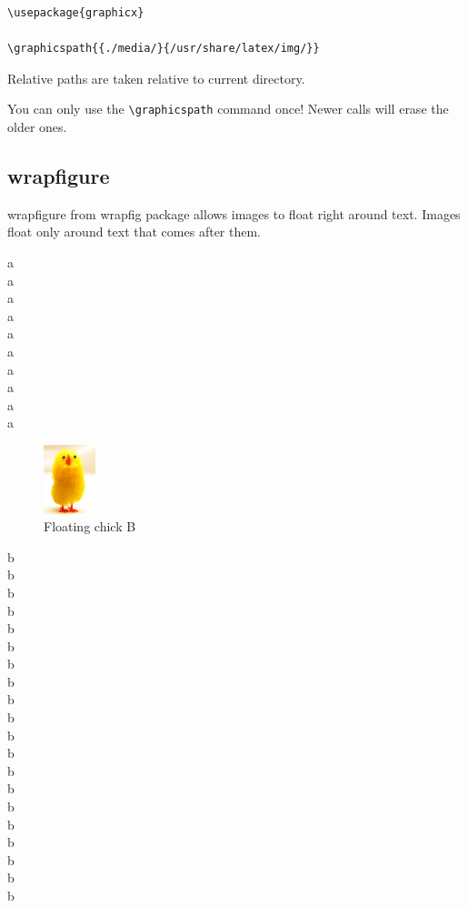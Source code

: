 \documentclass[12pt]{article}
\begin{document}
\begin{lstlisting}
\usepackage{graphicx}

\graphicspath{{./media/}{/usr/share/latex/img/}}
\end{lstlisting}

Relative paths are taken relative to current directory.

You can only use the \lstinline|\graphicspath| command once! Newer calls will erase the older ones.

%

\subsection{wrapfigure}\label{wrapfigure}%

wrapfigure from wrapfig package allows images to float right around text.
Images float only around text that comes after them.

a \\ a \\ a \\ a\\ a \\ a \\ a \\ a \\ a\\ a \\

\begin{figure}
\includegraphics[height=2cm]{image.png}
\caption{Floating chick B}
\end{figure}

b \\ b \\ b \\ b\\ b \\ b \\ b \\ b \\ b\\ b \\
b \\ b \\ b \\ b\\ b \\ b \\ b \\ b \\ b\\ b \\
\end{document}
